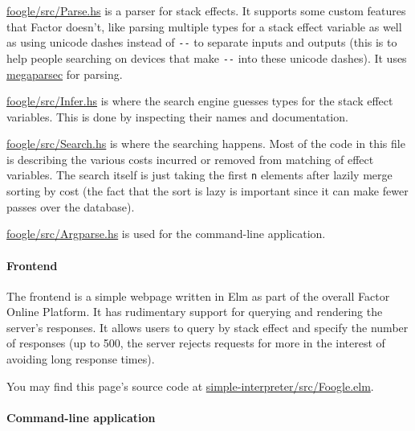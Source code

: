 \documentclass[
]{article}
\begin{document}
\href{https://github.com/factor-hmc/foogle/blob/master/src/Parse.hs}{foogle/src/Parse.hs}
is a parser for stack effects. It supports some custom features that
Factor doesn't, like parsing multiple types for a stack effect variable
as well as using unicode dashes instead of \texttt{-\/-} to separate
inputs and outputs (this is to help people searching on devices that
make \texttt{-\/-} into these unicode dashes). It uses
\href{https://hackage.haskell.org/package/megaparsec}{megaparsec} for
parsing.

\href{https://github.com/factor-hmc/foogle/blob/master/src/Infer.hs}{foogle/src/Infer.hs}
is where the search engine guesses types for the stack effect variables.
This is done by inspecting their names and documentation.

\href{https://github.com/factor-hmc/foogle/blob/master/src/Search.hs}{foogle/src/Search.hs}
is where the searching happens. Most of the code in this file is
describing the various costs incurred or removed from matching of effect
variables. The search itself is just taking the first \texttt{n}
elements after lazily merge sorting by cost (the fact that the sort is
lazy is important since it can make fewer passes over the database).

\href{https://github.com/factor-hmc/foogle/blob/master/src/Argparse.hs}{foogle/src/Argparse.hs}
is used for the command-line application.

\hypertarget{frontend}{%
\paragraph{Frontend}\label{frontend}}

The frontend is a simple webpage written in Elm as part of the overall
Factor Online Platform. It has rudimentary support for querying and
rendering the server's responses. It allows users to query by stack
effect and specify the number of responses (up to 500, the server
rejects requests for more in the interest of avoiding long response
times).

You may find this page's source code at
\href{https://github.com/factor-hmc/simple-interpreter/blob/master/src/Foogle.elm}{simple-interpreter/src/Foogle.elm}.

\hypertarget{command-line-application}{%
\paragraph{Command-line application}\label{command-line-application}}
\end{document}
